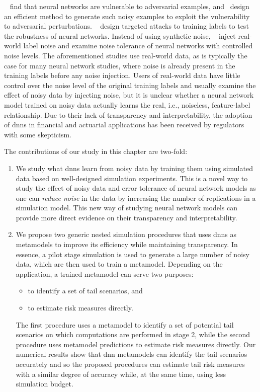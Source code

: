 ~\cite{szegedy2013intriguing} find that neural networks are vulnerable to adversarial examples, and~\cite{goodfellow2014explaining} design an efficient method to generate such noisy examples to exploit the vulnerability to adversarial perturbations.
~\cite{carlini2017towards} design targeted attacks to training labels to test the robustness of neural networks. 
Instead of using synthetic noise, ~\cite{jiang2020beyond} inject real-world label noise and examine noise tolerance of neural networks with controlled noise levels.
The aforementioned studies use real-world data, as is typically the case for many neural network studies, where noise is already present in the training labels before any noise injection.
Users of real-world data have little control over the noise level of the original training labels and usually examine the effect of noisy data by injecting noise, but it is unclear whether a neural network model trained on noisy data actually learns the real, i.e., noiseless, feature-label relationship.
Due to their lack of transparency and interpretability, the adoption of \gls{dnn}s in financial and actuarial applications has been received by regulators with some skepticism.

The contributions of our study in this chapter are two-fold:
\begin{enumerate}
    \item We study what \gls{dnn}s learn from noisy data by training them using simulated data based on well-designed simulation experiments.
    This is a novel way to study the effect of noisy data and error tolerance of neural network models as one can \textit{reduce noise} in the data by increasing the number of replications in a simulation model.
    This new way of studying neural network models can provide more direct evidence on their transparency and interpretability. 
    \item We propose two generic nested simulation procedures that uses \gls{dnn}s as metamodels to improve its efficiency while maintaining transparency. 
    In essence, a pilot stage simulation is used to generate a large number of noisy data, which are then used to train a metamodel.
    Depending on the application, a trained metamodel can serve two purposes: 
    \begin{itemize}
        \item to identify a set of tail scenarios, and 
        \item to estimate risk measures directly.
    \end{itemize}
    The first procedure uses a metamodel to identify a set of potential tail scenarios on which computations are performed in stage 2, while the second procedure uses metamodel predictions to estimate risk measures directly.
    Our numerical results show that \gls{dnn} metamodels can identify the tail scenarios accurately and so the proposed procedures can estimate tail risk measures with a similar degree of accuracy while, at the same time, using less simulation budget.
\end{enumerate}

